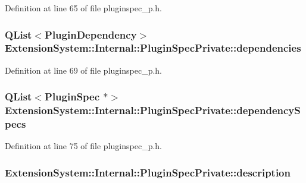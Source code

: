 \-Definition at line 65 of file pluginspec\-\_\-p.\-h.

\hypertarget{class_extension_system_1_1_internal_1_1_plugin_spec_private_a1f765a1f76bd2ba2f296f84289e9b44f}{
\subsubsection[{dependencies}]{\setlength{\rightskip}{0pt plus 5cm}\-Q\-List$<${\bf \-Plugin\-Dependency}$>$ {\bf \-Extension\-System\-::\-Internal\-::\-Plugin\-Spec\-Private\-::dependencies}}}\label{class_extension_system_1_1_internal_1_1_plugin_spec_private_a1f765a1f76bd2ba2f296f84289e9b44f}


\-Definition at line 69 of file pluginspec\-\_\-p.\-h.

\hypertarget{class_extension_system_1_1_internal_1_1_plugin_spec_private_abd32e8602856b2fe48fed8140846be54}{
\subsubsection[{dependency\-Specs}]{\setlength{\rightskip}{0pt plus 5cm}\-Q\-List$<${\bf \-Plugin\-Spec} $\ast$$>$ {\bf \-Extension\-System\-::\-Internal\-::\-Plugin\-Spec\-Private\-::dependency\-Specs}}}\label{class_extension_system_1_1_internal_1_1_plugin_spec_private_abd32e8602856b2fe48fed8140846be54}


\-Definition at line 75 of file pluginspec\-\_\-p.\-h.

\hypertarget{class_extension_system_1_1_internal_1_1_plugin_spec_private_a477c1550169cba561d0cede9d8dc5c2b}{
\subsubsection[{description}]{ {\bf \-Extension\-System\-::\-Internal\-::\-Plugin\-Spec\-Private\-::description}}}\label{class_extension_system_1_1_internal_1_1_plugin_spec_private_a477c1550169cba561d0cede9d8dc5c2b}



